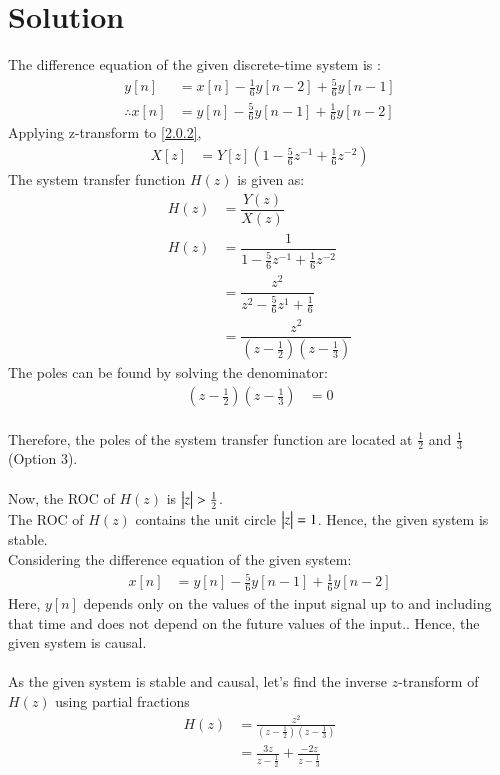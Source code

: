 \documentclass[journal,12pt,twocolumn]{IEEEtran}
\begin{document}
\section{Solution}
The difference equation of the given discrete-time system is :
\begin{align}
    y[n] &= x[n] - \frac{1}{6}y[n-2] + \frac{5}{6}y[n-1] \\
    \therefore x[n] &= y[n] - \frac{5}{6}y[n-1] + \frac{1}{6}y[n-2] \label{2.0.2}
\end{align}
Applying z-transform to \eqref{2.0.2},
\begin{align}
    X[z] &= Y[z]\left(1 - \frac{5}{6}z^{-1} + \frac{1}{6}z^{-2}\right)
\end{align}
The system transfer function $H(z)$ is given as:
\begin{align}
    H(z) &= \dfrac{Y(z)}{X(z)}\\
    H(z) &= \dfrac{1}{1 - \frac{5}{6}z^{-1} + \frac{1}{6}z^{-2}}\\
    &= \dfrac{z^2}{z^2 - \frac{5}{6}z^{1} + \frac{1}{6}}\\
    &= \dfrac{z^2}{(z-\frac{1}{2})(z-\frac{1}{3})}
\end{align}
The poles can be found by solving the denominator:
\begin{align}
    \left(z-\frac{1}{2}\right)\left(z-\frac{1}{3}\right) &= 0
\end{align}
\\Therefore, the poles of the system transfer function are located at $\frac{1}{2}$ and $\frac{1}{3}$ (Option 3).
\\\\Now, the ROC of $H(z)$ is $\begin{vmatrix}z\end{vmatrix} > \frac{1}{2}$.
\\The ROC of $H(z)$ contains the unit circle $\begin{vmatrix}z\end{vmatrix} = 1$. Hence, the given system is stable.
\\Considering the difference equation of the given system:
\begin{align}
    x[n] &= y[n] - \frac{5}{6}y[n-1] + \frac{1}{6}y[n-2]
\end{align}
Here, $y[n]$ depends only on the values of the input signal up to and including that time and does not depend on the future values of the input.. Hence, the given system is causal.
\\\\
As the given system is stable and causal, let's find the inverse $z$-transform of $H(z)$ using partial fractions
\begin{align}
    H(z) &= \frac{z^2}{\left(z - \frac{1}{2}\right)\left(z - \frac{1}{3}\right)}\\
    &= \frac{3z}{z - \frac{1}{2}} + \frac{-2z}{z - \frac{1}{3}}
\end{align}
\end{document}
